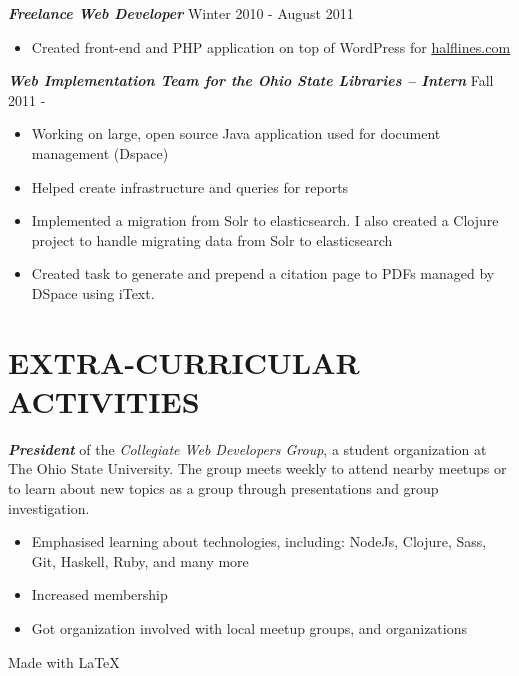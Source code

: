 \documentclass[line,letterpaper]{resume}
\begin{document}
\begin{resume}
    {\sl\textbf{Freelance Web Developer}} \hfill Winter 2010 - August 2011\\
    \vspace{-8pt}
    \begin{itemize}  
        \item Created front-end and PHP application on top of WordPress for
            \href{http://halflines.com/}{halflines.com}
    \end{itemize} 
    {\sl\textbf{Web Implementation Team for the Ohio State Libraries -- Intern}}
    \hfill Fall 2011 - \\
    \vspace{-8pt}
    \begin{itemize}  
        \item Working on large, open source Java application used for document
            management (Dspace)
        \item Helped create infrastructure and queries for reports
        \item Implemented a migration from Solr to elasticsearch. I also created
            a Clojure project to handle migrating data from Solr to
            elasticsearch
        \item Created task to generate and prepend a citation page to PDFs
            managed by DSpace using iText.
    \end{itemize} 

    \vspace{-6pt}

    \section{\uppercase{Extra-Curricular Activities}}             
    \emph{\textbf{President}} of the \emph{Collegiate Web Developers Group}, a
    student organization at The Ohio State University. The group meets weekly to
    attend nearby meetups or to learn about new topics as a group through
    presentations and group investigation.\\
    \begin{itemize}
        \item Emphasised learning about technologies, including:
            NodeJs, Clojure, Sass, Git, Haskell, Ruby, and many more
        \item Increased membership
        \item Got organization involved with local meetup groups, and
            organizations
    \end{itemize}

\end{resume}
\hfill Made with \LaTeX{}
\end{document}
